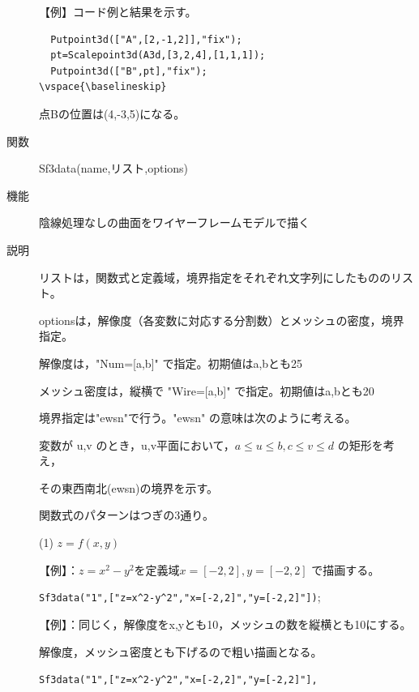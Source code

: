 \documentclass[papersize,a4paper,12pt,uplatex]{jsarticle}
\begin{document}
\begin{description}
\vspace{\baselineskip}
【例】コード例と結果を示す。

\begin{verbatim}
  Putpoint3d(["A",[2,-1,2]],"fix");
  pt=Scalepoint3d(A3d,[3,2,4],[1,1,1]); 
  Putpoint3d(["B",pt],"fix");
\vspace{\baselineskip}
\end{verbatim}

点Bの位置は(4,-3,5)になる。
\vspace{\baselineskip}
\hypertarget{sf3data}{}
\item[関数]  Sf3data(name,リスト,options)
\item[機能]  陰線処理なしの曲面をワイヤーフレームモデルで描く
\item[説明]  リストは，関数式と定義域，境界指定をそれぞれ文字列にしたもののリスト。

optionsは，解像度（各変数に対応する分割数）とメッシュの密度，境界指定。

解像度は，"Num=[a,b]" で指定。初期値はa,bとも25

メッシュ密度は，縦横で "Wire=[a,b]" で指定。初期値はa,bとも20

境界指定は"ewsn"で行う。"ewsn" の意味は次のように考える。

変数が u,v のとき，u,v平面において，$a \leq u \leq b,c \leq v \leq d$ の矩形を考え，

その東西南北(ewsn)の境界を示す。

 \begin{center}  \end{center}

\vspace{\baselineskip}
関数式のパターンはつぎの3通り。

\vspace{\baselineskip}
(1) $z=f(x,y)$

 【例】：$z=x^2-y^2$を定義域$x=[-2,2],y=[-2,2]$ で描画する。
  
  \verb|Sf3data("1",["z=x^2-y^2","x=[-2,2]","y=[-2,2]"])|;
      
  \begin{center}  \end{center}

 【例】：同じく，解像度をx,yとも10，メッシュの数を縦横とも10にする。
 
 解像度，メッシュ密度とも下げるので粗い描画となる。
   
\verb|Sf3data("1",["z=x^2-y^2","x=[-2,2]","y=[-2,2]"],|
      

\end{description}
\end{document}

